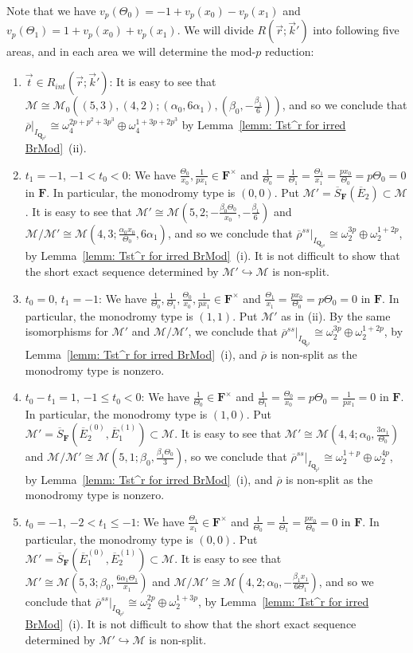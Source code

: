 \documentclass[11pt]{amsart}
\theoremstyle{definition}
\numberwithin{equation}{subsection}
\theoremstyle{plain}
\theoremstyle{plain}
\theoremstyle{plain}
\theoremstyle{plain}
\theoremstyle{plain}
\theoremstyle{plain}
\theoremstyle{plain}
\theoremstyle{plain}
\theoremstyle{plain}
\theoremstyle{plain}
\theoremstyle{plain}
\theoremstyle{plain}
\theoremstyle{definition}
\theoremstyle{definition}
\theoremstyle{definition}
\theoremstyle{remark}
\renewcommand{\(}{\textup{(}}
\renewcommand{\)}{\textup{)}}
\newcommand{\Q}{\mathbf{Q}}
\newcommand{\F}{\mathbf{F}}
\newcommand{\barS}{\overline{S}}
\newcommand{\rhobar}{\overline{\rho}}
\newcommand{\cM}{\mathcal{M}}
\newcommand{\barE}{\overline{E}}
\newcommand{\vr}{\vec{r}}
\newcommand{\vk}{\vec{k}}
\newcommand{\IQptwo}{{I_{\Q_{p^2}}}}
\begin{document}
Note that we have $v_p(\Theta_0)=-1+v_p(x_0)-v_p(x_1)$ and $v_p(\Theta_1)=1+v_p(x_0)+v_p(x_1)$. We will divide $R(\vr;\vk')$ into following five areas, and in each area we will determine the mod-$p$ reduction:
\begin{enumerate}[leftmargin=*]
  \item $\vec{t}\in R_{int}(\vr;\vk')$: It is easy to see that $\cM\cong\cM_0((5,3),(4,2);(\alpha_0,6\alpha_1),(\beta_0,-\frac{\beta_1}{6}))$, and so we conclude that $\rhobar|_\IQptwo\cong\omega_4^{2p+p^2+3p^3}\oplus\omega_4^{1+3p+2p^3}$ by Lemma~\ref{lemm: Tst^r for irred BrMod}~(ii).
  \item $t_1=-1$, $-1<t_0<0$: We have $\frac{\Theta_0}{x_0},\frac{1}{px_1}\in\F^\times$ and $\frac{1}{\Theta_0}=\frac{1}{\Theta_1}=\frac{\Theta_1}{x_1}=\frac{px_0}{\Theta_0}=p\Theta_0=0$ in $\F$. In particular, the monodromy type is $(0,0)$. Put $\cM'=\barS_{\F}(\barE_2)\subset\cM$. It is easy to see that $\cM'\cong\cM(5,2;-\frac{\beta_0\Theta_0}{x_0},-\frac{\beta_1}{6})$ and $\cM/\cM'\cong\cM(4,3;\frac{\alpha_0x_0}{\Theta_0},6\alpha_1)$, and so we conclude that $\rhobar^{ss}|_\IQptwo\cong \omega_2^{3p}\oplus\omega_2^{1+2p}$, by Lemma~\ref{lemm: Tst^r for irred BrMod}~(i). It is not difficult to show that the short exact sequence determined by $\cM'\hookrightarrow \cM$ is non-split.
  \item $t_0=0$, $t_1=-1$: We have $\frac{1}{\Theta_0},\frac{1}{\Theta_1},\frac{\Theta_0}{x_0},\frac{1}{px_1}\in\F^\times$ and $\frac{\Theta_1}{x_1}=\frac{px_0}{\Theta_0}=p\Theta_0=0$ in $\F$. In particular, the monodromy type is $(1,1)$.  Put $\cM'$ as in (ii). By the same isomorphisms for $\cM'$ and $\cM/\cM'$, we conclude that $\rhobar^{ss}|_\IQptwo\cong \omega_2^{3p}\oplus\omega_2^{1+2p}$, by Lemma~\ref{lemm: Tst^r for irred BrMod}~(i), and $\rhobar$ is non-split as the monodromy type is nonzero.
  \item $t_0-t_1=1$, $-1\leq t_0<0$: We have $\frac{1}{\Theta_0}\in\F^\times$ and $\frac{1}{\Theta_1}=\frac{\Theta_0}{x_0}=p\Theta_0=\frac{1}{px_1}=0$ in $\F$. In particular, the monodromy type is $(1,0)$.
      Put $\cM'=\barS_{\F}(\barE_2^{(0)},\barE_1^{(1)})\subset\cM$. It is easy to see that $\cM'\cong\cM(4,4;\alpha_0,\frac{3\alpha_1}{\Theta_0})$ and $\cM/\cM'\cong\cM(5,1;\beta_0,\frac{\beta_1\Theta_0}{3})$, so we conclude that $\rhobar^{ss}|_\IQptwo\cong\omega_2^{1+p}\oplus\omega_2^{4p}$, by Lemma~\ref{lemm: Tst^r for irred BrMod}~(i), and $\rhobar$ is non-split as the monodromy type is nonzero.
  \item $t_0=-1$, $-2<t_1\leq -1$: We have $\frac{\Theta_1}{x_1}\in\F^\times$ and $\frac{1}{\Theta_0}=\frac{1}{\Theta_1}=\frac{px_0}{\Theta_0}=0$ in $\F$. In particular, the monodromy type is $(0,0)$. Put $\cM'=\barS_{\F}(\barE_1^{(0)},\barE_2^{(1)})\subset\cM$. It is easy to see that $\cM'\cong\cM(5,3;\beta_0,\frac{6\alpha_1\Theta_1}{x_1})$ and $\cM/\cM'\cong\cM(4,2;\alpha_0,-\frac{\beta_1x_1}{6\Theta_1})$, and so we conclude that $\rhobar^{ss}|_\IQptwo\cong\omega_2^{2p}\oplus\omega_2^{1+3p}$, by Lemma~\ref{lemm: Tst^r for irred BrMod}~(i). It is not difficult to show that the short exact sequence determined by $\cM'\hookrightarrow \cM$ is non-split.
\end{enumerate}
\end{document}
